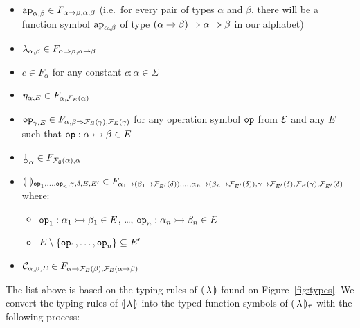 \begin{itemize}
\item $\operatorname{ap}_{\alpha, \beta} \in F_{\alpha \to \beta, \alpha, \beta}$
  (i.e.\ for every pair of types $\alpha$ and $\beta$, there will be a
  function symbol $\operatorname{ap}_{\alpha,\beta}$ of type $(\alpha \to \beta) \Rightarrow
  \alpha \Rightarrow \beta$ in our alphabet)
\item $\lambda_{\alpha, \beta} \in F_{\alpha \Rightarrow \beta, \alpha \to \beta}$
\item $c \in F_{\alpha}$ for any constant $c : \alpha \in \Sigma$
\item $\eta_{\alpha, E} \in F_{\alpha, \mathcal{F}_E(\alpha)}$
\item $\mathtt{op}_{\gamma, E} \in F_{\alpha, \beta \Rightarrow \mathcal{F}_E(\gamma),
  \mathcal{F}_E(\gamma)}$ for any operation symbol $\mathtt{op}$ from $\mathcal{E}$ and any $E$
  such that $\mathtt{op} : \alpha \rightarrowtail \beta \in E$
\item $\cherry_\alpha \in F_{\FF_\emptyset(\alpha), \alpha}$
\item $\llparenthesis \,  \, \rrparenthesis_{\mathtt{op}_1, \ldots, \mathtt{op}_n, \gamma, \delta, E, E'} \in F_{\alpha_1 \to (\beta_1 \to \mathcal{F}_{E'}(\delta)), \ldots,
  \alpha_n \to (\beta_n \to \mathcal{F}_{E'}(\delta)), \gamma \to \mathcal{F}_{E'}(\delta),
  \mathcal{F}_E(\gamma), \mathcal{F}_{E'}(\delta)}$ where:
  \begin{itemize}
  \item $\mathtt{op}_1 : \alpha_1 \rightarrowtail \beta_1 \in E$, \ldots,
    $\mathtt{op}_n : \alpha_n \rightarrowtail \beta_n \in E$
  \item $E \setminus \{\mathtt{op}_1, \ldots, \mathtt{op}_n\} \subseteq E'$
  \end{itemize}
\item $\mathcal{C}_{\alpha,\beta,E} \in F_{\alpha \to \mathcal{F}_E(\beta),\mathcal{F}_E(\alpha \to
  \beta)}$
\end{itemize}

The list above is based on the typing rules of $\llparenthesis \, \lambda \, \rrparenthesis$ found on
Figure~\ref{fig:types}. We convert the typing rules of $\llparenthesis \, \lambda \, \rrparenthesis$
into the typed function symbols of $\llparenthesis \, \lambda \, \rrparenthesis_\tau$ with the
following process:

